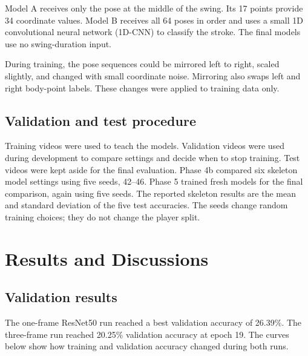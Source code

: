 \documentclass[12pt,a4paper]{article}
\begin{document}
Model A receives only the pose at the middle of the swing. Its 17 points provide 34 coordinate values. Model B receives all 64 poses in order and uses a small 1D convolutional neural network (1D-CNN) to classify the stroke. The final models use no swing-duration input.

During training, the pose sequences could be mirrored left to right, scaled slightly, and changed with small coordinate noise. Mirroring also swaps left and right body-point labels. These changes were applied to training data only.

\subsection{Validation and test procedure}
Training videos were used to teach the models. Validation videos were used during development to compare settings and decide when to stop training. Test videos were kept aside for the final evaluation. Phase 4b compared six skeleton model settings using five seeds, 42--46. Phase 5 trained fresh models for the final comparison, again using five seeds. The reported skeleton results are the mean and standard deviation of the five test accuracies. The seeds change random training choices; they do not change the player split.

\clearpage
\section{Results and Discussions}
\subsection{Validation results}
The one-frame ResNet50 run reached a best validation accuracy of 26.39\%. The three-frame run reached 20.25\% validation accuracy at epoch 19. The curves below show how training and validation accuracy changed during both runs.
\end{document}
